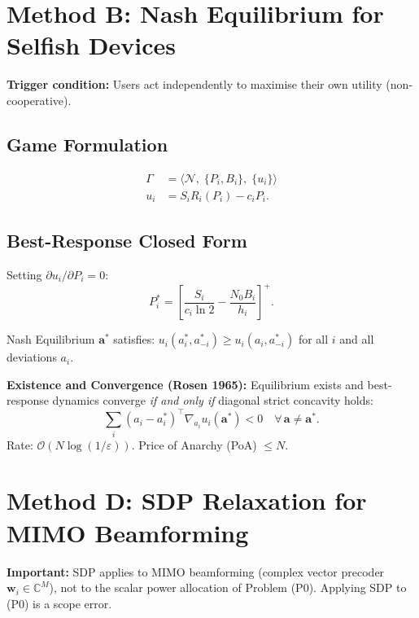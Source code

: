 \documentclass[conference]{IEEEtran}
\begin{document}
\section{Method B: Nash Equilibrium for Selfish Devices}
\label{sec:nash}

\textbf{Trigger condition:} Users act independently to maximise their own utility (non-cooperative).

\subsection{Game Formulation}

\begin{align}
\Gamma &= \langle\mathcal{N},\;\{P_i,B_i\},\;\{u_i\}\rangle\\
u_i    &= S_i R_i(P_i) - c_i P_i.
\end{align}

\subsection{Best-Response Closed Form}

Setting $\partial u_i / \partial P_i = 0$:
\begin{equation}
P_i^* = \left[\frac{S_i}{c_i \ln 2} - \frac{N_0 B_i}{h_i}\right]^+.
\end{equation}

Nash Equilibrium $\mathbf{a}^*$ satisfies:
$u_i(a_i^*, a_{-i}^*) \ge u_i(a_i, a_{-i}^*)$ for all $i$ and all deviations $a_i$.

\textbf{Existence and Convergence (Rosen 1965):} Equilibrium exists and best-response dynamics converge \emph{if and only if} diagonal strict concavity holds:
\begin{equation}
\sum_i (a_i - a_i^*)^\top \nabla_{a_i} u_i(\mathbf{a}^*) < 0
\quad\forall\,\mathbf{a}\ne\mathbf{a}^*.
\end{equation}
Rate: $\mathcal{O}(N\log(1/\varepsilon))$.
Price of Anarchy (PoA) $\le N$.

\section{Method D: SDP Relaxation for MIMO Beamforming}
\label{sec:sdp}

\textbf{Important:} SDP applies to MIMO beamforming (complex vector precoder $\mathbf{w}_i \in \mathbb{C}^M$), not to the scalar power allocation of Problem (P0). Applying SDP to (P0) is a scope error.
\end{document}
